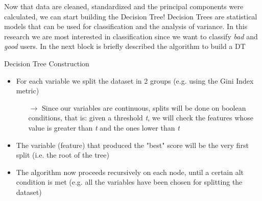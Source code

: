 	\begin{frame}
		Now that data are cleaned, standardized and the principal components were calculated, we can start building the Decision Tree!\newline\newline
		Decision Trees are statistical models that can be used for classification and the analysis of variance.\newline\newline
		In this research we are most interested in classification since we want to classify \emph{bad} and \emph{good} users. In the next block is briefly described the algorithm to build a DT
		\begin{block}{Decision Tree Construction}
			\begin{itemize}
				\item For each variable we split the dataset in 2 groups (e.g. using the Gini Index metric)
				\begin{itemize}
					\item[$\rightarrow$] Since our variables are continuous, splits will be done on boolean conditions, that is: given a threshold \emph{t}, we will check the features whose value is greater than \emph{t} and the ones lower than \emph{t}
				\end{itemize}
				\item The variable (feature) that produced the "best" score will be the very first split (i.e. the root of the tree)
				\item The algorithm now proceeds recursively on each node, until a certain alt condition is met (e.g. all the variables have been chosen for splitting the dataset)
			\end{itemize}
		\end{block}
	\end{frame}
	
